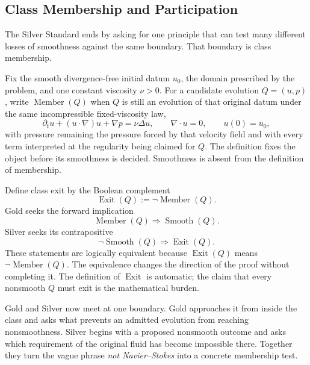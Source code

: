 \subsection{Class Membership and Participation}\label{sub:ClassMembershipAndParticipation}

The Silver Standard ends by asking for one principle that can test many different losses of smoothness against the same boundary.
That boundary is class membership.

Fix the smooth divergence-free initial datum \(u_0\), the domain prescribed by the problem, and one constant viscosity \(\nu>0\).
For a candidate evolution \(Q=(u,p)\), write \(\operatorname{Member}(Q)\) when \(Q\) is still an evolution of that original datum under the same incompressible fixed-viscosity law,
\[
  \partial_tu+(u\cdot\nabla)u+\nabla p=\nu\Delta u,
  \qquad
  \nabla\cdot u=0,
  \qquad
  u(0)=u_0,
\]
with pressure remaining the pressure forced by that velocity field and with every term interpreted at the regularity being claimed for \(Q\).
The definition fixes the object before its smoothness is decided.
Smoothness is absent from the definition of membership.

Define class exit by the Boolean complement
\[
  \operatorname{Exit}(Q):=\neg\operatorname{Member}(Q).
\]
Gold seeks the forward implication
\[
  \operatorname{Member}(Q)
  \Longrightarrow
  \operatorname{Smooth}(Q).
\]
Silver seeks its contrapositive
\[
  \neg\operatorname{Smooth}(Q)
  \Longrightarrow
  \operatorname{Exit}(Q).
\]
These statements are logically equivalent because \(\operatorname{Exit}(Q)\) means \(\neg\operatorname{Member}(Q)\).
The equivalence changes the direction of the proof without completing it.
The definition of \(\operatorname{Exit}\) is automatic; the claim that every nonsmooth \(Q\) must exit is the mathematical burden.

Gold and Silver now meet at one boundary.
Gold approaches it from inside the class and asks what prevents an admitted evolution from reaching nonsmoothness.
Silver begins with a proposed nonsmooth outcome and asks which requirement of the original fluid has become impossible there.
Together they turn the vague phrase \emph{not Navier--Stokes} into a concrete membership test.


